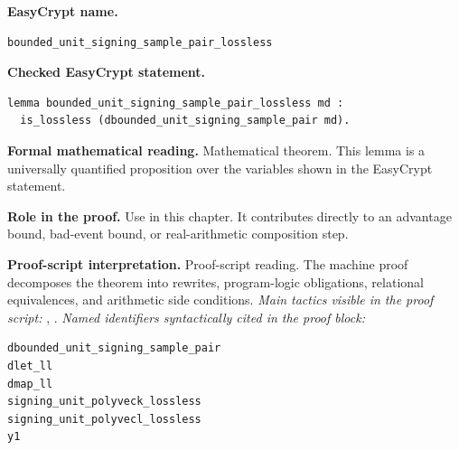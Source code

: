 \begin{formaltheorem}
\noindent\textbf{EasyCrypt name.}
\begin{lstlisting}[language=EasyCrypt,basicstyle=\ttfamily\scriptsize]
bounded_unit_signing_sample_pair_lossless
\end{lstlisting}
\noindent\textbf{Checked EasyCrypt statement.}
\begin{lstlisting}[language=EasyCrypt,basicstyle=\ttfamily\scriptsize]
lemma bounded_unit_signing_sample_pair_lossless md :
  is_lossless (dbounded_unit_signing_sample_pair md).
\end{lstlisting}
\noindent\textbf{Formal mathematical reading.}
Mathematical theorem. This lemma is a universally quantified proposition over the variables shown in the EasyCrypt statement.

\noindent\textbf{Role in the proof.}
Use in this chapter. It contributes directly to an advantage bound, bad-event bound, or real-arithmetic composition step.

\noindent\textbf{Proof-script interpretation.}
Proof-script reading. The machine proof decomposes the theorem into rewrites, program-logic obligations, relational equivalences, and arithmetic side conditions.
\emph{Main tactics visible in the proof script:} , .
\emph{Named identifiers syntactically cited in the proof block:}
\begin{lstlisting}[language=EasyCrypt,basicstyle=\ttfamily\scriptsize]
dbounded_unit_signing_sample_pair
dlet_ll
dmap_ll
signing_unit_polyveck_lossless
signing_unit_polyvecl_lossless
y1
\end{lstlisting}

\end{formaltheorem}

